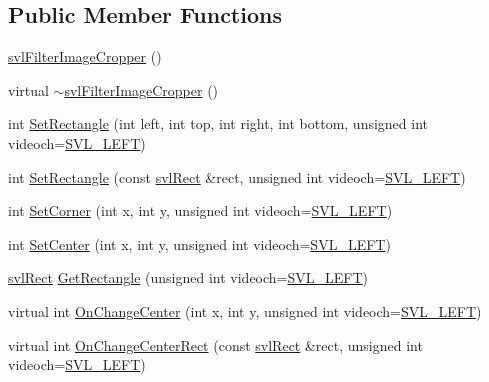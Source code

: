 \subsection*{Public Member Functions}
\begin{DoxyCompactItemize}
\item 
\hyperlink{classsvl_filter_image_cropper_a6dd807a3fbbe812f87378965fe3dd957}{svl\-Filter\-Image\-Cropper} ()
\item 
virtual \hyperlink{classsvl_filter_image_cropper_a37e10afabb4b758c7e0c91ac7b90fe49}{$\sim$svl\-Filter\-Image\-Cropper} ()
\item 
int \hyperlink{classsvl_filter_image_cropper_af00bdbf2b6638453aeeefa41b58bdba1}{Set\-Rectangle} (int left, int top, int right, int bottom, unsigned int videoch=\hyperlink{svl_definitions_8h_ab9fec7615f19c8df2919eebcab0b187f}{S\-V\-L\-\_\-\-L\-E\-F\-T})
\item 
int \hyperlink{classsvl_filter_image_cropper_af26e9acc8c27b2835c0e28cc4dee4278}{Set\-Rectangle} (const \hyperlink{structsvl_rect}{svl\-Rect} \&rect, unsigned int videoch=\hyperlink{svl_definitions_8h_ab9fec7615f19c8df2919eebcab0b187f}{S\-V\-L\-\_\-\-L\-E\-F\-T})
\item 
int \hyperlink{classsvl_filter_image_cropper_a05b129a4e6aca2c476e02cf7ca94eaca}{Set\-Corner} (int x, int y, unsigned int videoch=\hyperlink{svl_definitions_8h_ab9fec7615f19c8df2919eebcab0b187f}{S\-V\-L\-\_\-\-L\-E\-F\-T})
\item 
int \hyperlink{classsvl_filter_image_cropper_a18b59d8470e71f016ec46fbc1e688ecc}{Set\-Center} (int x, int y, unsigned int videoch=\hyperlink{svl_definitions_8h_ab9fec7615f19c8df2919eebcab0b187f}{S\-V\-L\-\_\-\-L\-E\-F\-T})
\item 
\hyperlink{structsvl_rect}{svl\-Rect} \hyperlink{classsvl_filter_image_cropper_a208c25e5185018761ba7412eaa67a876}{Get\-Rectangle} (unsigned int videoch=\hyperlink{svl_definitions_8h_ab9fec7615f19c8df2919eebcab0b187f}{S\-V\-L\-\_\-\-L\-E\-F\-T})
\item 
virtual int \hyperlink{classsvl_filter_image_cropper_a77e4d5b382b25768300adb7d4ed139d7}{On\-Change\-Center} (int x, int y, unsigned int videoch=\hyperlink{svl_definitions_8h_ab9fec7615f19c8df2919eebcab0b187f}{S\-V\-L\-\_\-\-L\-E\-F\-T})
\item 
virtual int \hyperlink{classsvl_filter_image_cropper_a637afb41415c13dfe6c5a8fdebc7656f}{On\-Change\-Center\-Rect} (const \hyperlink{structsvl_rect}{svl\-Rect} \&rect, unsigned int videoch=\hyperlink{svl_definitions_8h_ab9fec7615f19c8df2919eebcab0b187f}{S\-V\-L\-\_\-\-L\-E\-F\-T})
\end{DoxyCompactItemize}
